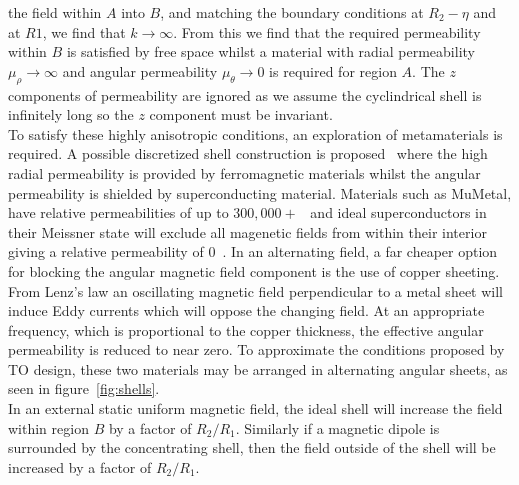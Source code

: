 \documentclass[11pt]{iopart}
\begin{document}
the field within $A$ into $B$, and matching the boundary conditions at
$R_2-\eta$ and at $R1$, we find that $k \rightarrow \infty$. From this
we find that the required permeability within $B$ is satisfied by free
space whilst a material with radial permeability $\mu_\rho \rightarrow
\infty$ and angular permeability $\mu_\theta \rightarrow 0$ is
required for region $A$. The $z$ components of permeability are ignored
as we assume the cyclindrical shell is
infinitely long so the $z$ component must be invariant.\\
To satisfy these highly anisotropic conditions, an exploration of
metamaterials is required. A possible discretized shell construction
is proposed~\cite{PRATT} where the high radial permeability is
provided by ferromagnetic materials whilst the angular permeability is
shielded by superconducting material. Materials such as MuMetal, have
relative permeabilities of up to $300,000+$~\cite{MUMETAL} and ideal
superconductors in their Meissner state will exclude all magenetic
fields from within their interior giving a relative permeability of
$0$~\cite{Meissner}. In an alternating field, a far cheaper option for
blocking the angular magnetic field component is the use of copper
sheeting. From Lenz's law an oscillating magnetic field perpendicular
to a metal sheet will induce Eddy currents which will oppose the
changing field. At an appropriate frequency, which is proportional to
the copper thickness, the effective angular permeability is reduced to
near zero. To approximate the conditions proposed by TO design, these
two materials may be arranged in alternating angular sheets, as seen
in figure~\ref{fig:shells}. \\
In an external static uniform magnetic field, the ideal shell will
increase the field within region $B$ by a factor of
$R_2/R_1$. Similarly if a magnetic dipole is surrounded by the
concentrating shell, then the field outside of the shell will be
increased by a factor of $R_2/R_1$. \\
\end{document}
